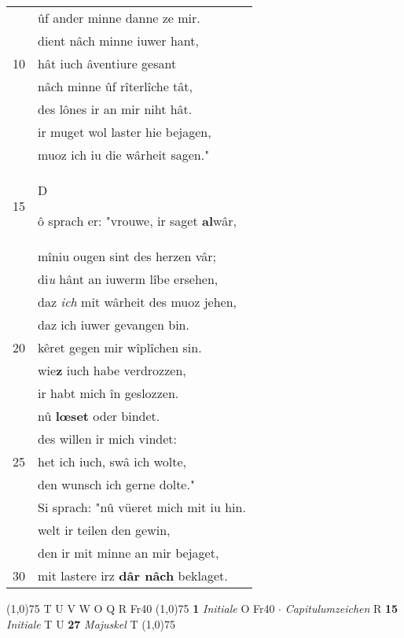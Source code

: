 \documentclass[8pt,a4paper,notitlepage]{article}
\begin{document}
\begin{table}[ht]
\begin{minipage}[t]{0.5\linewidth}
\begin{tabular}{rl}
 & ûf ander minne danne ze mir.\\ 
 & dient nâch minne iuwer hant,\\ 
10 & hât iuch âventiure gesant\\ 
 & nâch minne ûf rîterlîche tât,\\ 
 & des lônes ir an mir niht hât.\\ 
 & ir muget wol laster hie bejagen,\\ 
 & muoz ich iu die wârheit sagen."\\ 
15 & \begin{large}D\end{large}ô sprach er: "vrouwe, ir saget \textbf{al}wâr,\\ 
 & mîniu ougen sint des herzen vâr;\\ 
 & di\textit{u} hânt an iuwerm lîbe ersehen,\\ 
 & daz \textit{ich} mit wârheit des muoz jehen,\\ 
 & daz ich iuwer gevangen bin.\\ 
20 & kêret gegen mir wîplîchen sin.\\ 
 & wie\textbf{z} iuch habe verdrozzen,\\ 
 & ir habt mich în geslozzen.\\ 
 & nû \textbf{lœset} oder bindet.\\ 
 & des willen ir mich vindet:\\ 
25 & het ich iuch, swâ ich wolte,\\ 
 & den wunsch ich gerne dolte."\\ 
 & Si sprach: "nû vüeret mich mit iu hin.\\ 
 & welt ir teilen den gewin,\\ 
 & den ir mit minne an mir bejaget,\\ 
30 & mit lastere irz \textbf{dâr nâch} beklaget.\\ 
\end{tabular}
\scriptsize
\line(1,0){75} \newline
T U V W O Q R Fr40 \newline
\line(1,0){75} \newline
\textbf{1} \textit{Initiale} O Fr40   $\cdot$ \textit{Capitulumzeichen} R  \textbf{15} \textit{Initiale} T U  \textbf{27} \textit{Majuskel} T  \newline
\line(1,0){75} \newline

\end{minipage}
\end{table}
\end{document}
